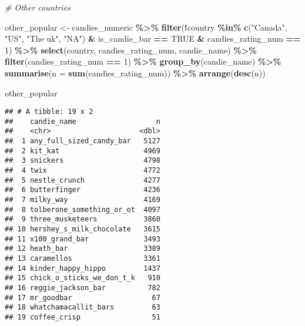 \documentclass[
]{article}
\newenvironment{Shaded}{\begin{snugshade}}{\end{snugshade}}
\newcommand{\AttributeTok}[1]{\textcolor[rgb]{0.13,0.29,0.53}{#1}}
\newcommand{\CommentTok}[1]{\textcolor[rgb]{0.56,0.35,0.01}{\textit{#1}}}
\newcommand{\ConstantTok}[1]{\textcolor[rgb]{0.56,0.35,0.01}{#1}}
\newcommand{\DecValTok}[1]{\textcolor[rgb]{0.00,0.00,0.81}{#1}}
\newcommand{\FunctionTok}[1]{\textcolor[rgb]{0.13,0.29,0.53}{\textbf{#1}}}
\newcommand{\NormalTok}[1]{#1}
\newcommand{\OtherTok}[1]{\textcolor[rgb]{0.56,0.35,0.01}{#1}}
\newcommand{\SpecialCharTok}[1]{\textcolor[rgb]{0.81,0.36,0.00}{\textbf{#1}}}
\newcommand{\StringTok}[1]{\textcolor[rgb]{0.31,0.60,0.02}{#1}}
\begin{document}
\begin{Shaded}
\begin{Highlighting}[]
\CommentTok{\# Other countries}

\NormalTok{other\_popular }\OtherTok{\textless{}{-}}\NormalTok{ candies\_numeric }\SpecialCharTok{\%\textgreater{}\%} 
  \FunctionTok{filter}\NormalTok{(}\SpecialCharTok{!}\NormalTok{country }\SpecialCharTok{\%in\%} \FunctionTok{c}\NormalTok{(}\StringTok{"Canada"}\NormalTok{, }\StringTok{"US"}\NormalTok{, }\StringTok{"The uk"}\NormalTok{, }\StringTok{"NA"}\NormalTok{) }
         \SpecialCharTok{\&}\NormalTok{ is\_candie\_bar }\SpecialCharTok{==} \ConstantTok{TRUE} 
         \SpecialCharTok{\&}\NormalTok{ candies\_rating\_num }\SpecialCharTok{==} \DecValTok{1}\NormalTok{) }\SpecialCharTok{\%\textgreater{}\%} 
  \FunctionTok{select}\NormalTok{(country, candies\_rating\_num, candie\_name) }\SpecialCharTok{\%\textgreater{}\%}
  \FunctionTok{filter}\NormalTok{(candies\_rating\_num }\SpecialCharTok{==} \DecValTok{1}\NormalTok{) }\SpecialCharTok{\%\textgreater{}\%}
  \FunctionTok{group\_by}\NormalTok{(candie\_name) }\SpecialCharTok{\%\textgreater{}\%} 
  \FunctionTok{summarise}\NormalTok{(}\AttributeTok{n =} \FunctionTok{sum}\NormalTok{(candies\_rating\_num)) }\SpecialCharTok{\%\textgreater{}\%} 
  \FunctionTok{arrange}\NormalTok{(}\FunctionTok{desc}\NormalTok{(n))}

\NormalTok{other\_popular}
\end{Highlighting}
\end{Shaded}

\begin{verbatim}
## # A tibble: 19 x 2
##    candie_name                   n
##    <chr>                     <dbl>
##  1 any_full_sized_candy_bar   5127
##  2 kit_kat                    4969
##  3 snickers                   4798
##  4 twix                       4772
##  5 nestle_crunch              4277
##  6 butterfinger               4236
##  7 milky_way                  4169
##  8 tolberone_something_or_ot  4097
##  9 three_musketeers           3860
## 10 hershey_s_milk_chocolate   3615
## 11 x100_grand_bar             3493
## 12 heath_bar                  3389
## 13 caramellos                 3361
## 14 kinder_happy_hippo         1437
## 15 chick_o_sticks_we_don_t_k   910
## 16 reggie_jackson_bar          782
## 17 mr_goodbar                   67
## 18 whatchamacallit_bars         63
## 19 coffee_crisp                 51
\end{verbatim}
\end{document}
